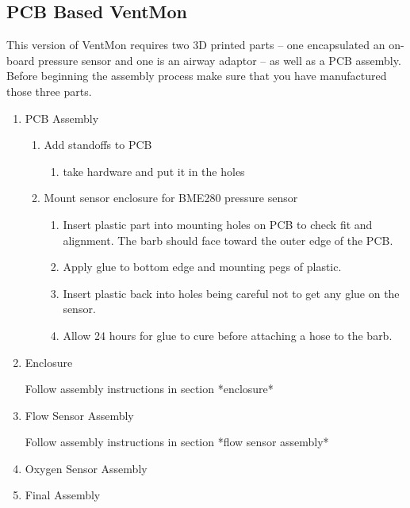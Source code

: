 \documentclass[11pt, letterpaper]{article}
\begin{document}

\subsection{PCB Based VentMon}

This version of VentMon requires two 3D printed parts  -- one encapsulated an on-board pressure sensor and one is an airway adaptor -- as well as a PCB assembly. Before beginning the assembly process make sure that you have manufactured those three parts.

\begin{enumerate}
\item
PCB Assembly

\begin{enumerate}[label=1.\arabic*]
\item Add standoffs to PCB
\begin{enumerate}[label=1.1.\arabic*]
\item take hardware and put it in the holes
\end{enumerate}

\item Mount sensor enclosure for BME280 pressure sensor
\begin{enumerate}[label=1.2.\arabic*]
\item Insert plastic part into mounting holes on PCB to check fit and alignment. The barb should face toward the outer edge of the PCB.
\item Apply glue to bottom edge and mounting pegs of plastic.
\item Insert plastic back into holes being careful not to get any glue on the sensor.
\item Allow 24 hours for glue to cure before attaching a hose to the barb.
\end{enumerate}


\end{enumerate}



\item
Enclosure

Follow assembly instructions in section *enclosure*


\item
Flow Sensor Assembly

Follow assembly instructions in section *flow sensor assembly*

\item
Oxygen Sensor Assembly



\item
Final Assembly

\end{enumerate}
\end{document}
